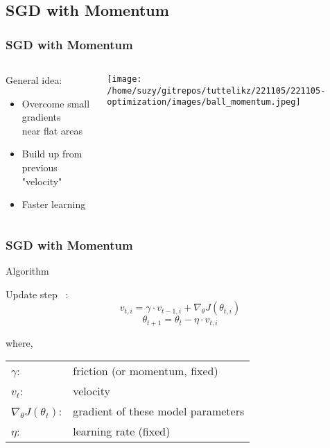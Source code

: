 \documentclass{beamer}
\begin{document}
    \subsection{SGD with Momentum}
    \begin{frame}
      \frametitle{SGD with Momentum} %
      
      \begin{columns}
          \begin{column}{0.5\textwidth}
            General idea:
            \begin{itemize}
              \item Overcome small gradients \\ near flat areas
              \item Build up from previous "velocity"
              \item Faster learning
            \end{itemize}
          \end{column}
          \begin{column}{0.5\textwidth}  %
              \begin{center}
                \texttt{[image: /home/suzy/gitrepos/tuttelikz/221105/221105-optimization/images/ball\_momentum.jpeg]}
              \end{center}
          \end{column}
      \end{columns}
    \end{frame}



    \begin{frame}
      \frametitle{SGD with Momentum}
      \begin{block}{Algorithm}

        Update step ~\cite{qian1999momentum}:
        \begin{equation}    %
          v_{t,i} = \gamma \cdot v_{t-1,i} + \nabla_{\theta}J(\theta_{t,i})
        \end{equation}
        \begin{equation}    %
          \theta_{t+1} = \theta_{t} - \eta \cdot v_{t,i}
        \end{equation}

        \vskip 0.3cm
        where, \\
        \begin{tabular}{l l}
          $\gamma$: & friction (or momentum, fixed) \\
          $v_{t}$: & velocity \\
          $\nabla_{\theta}J(\theta_t)$: & gradient of these model parameters \\
          $\eta$: & learning rate (fixed)
        \end{tabular}
      \end{block}
    \end{frame}
\end{document}
